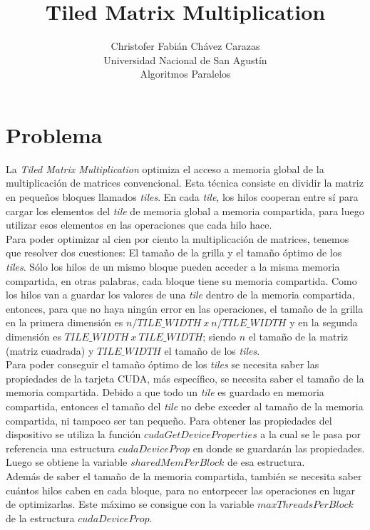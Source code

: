 \documentclass[a4paper,12pt]{article}
\begin{document}
\title{Tiled Matrix Multiplication}
\author{
Christofer Fabián Chávez Carazas \\
\small{Universidad Nacional de San Agustín} \\
\small{Algoritmos Paralelos}
}

\maketitle

\section{Problema}

La \textit{Tiled Matrix Multiplication} optimiza el acceso a memoria global de la multiplicación de matrices
convencional. Esta técnica consiste en dividir la matriz en pequeños bloques llamados \textit{tiles}. En cada \textit{tile},
los hilos cooperan entre sí para cargar los elementos del \textit{tile} de memoria global a memoria compartida, para luego
utilizar esos elementos en las operaciones que cada hilo hace. \\
Para poder optimizar al cien por ciento la multiplicación de matrices, tenemos que resolver dos cuestiones: El tamaño de la
grilla y el tamaño óptimo de los \textit{tiles}. Sólo los hilos de un mismo bloque pueden acceder a la misma memoria compartida,
en otras palabras, cada bloque tiene su memoria compartida. Como los hilos van a guardar los valores de una \textit{tile}
dentro de la memoria compartida, entonces, para que no haya ningún error en las operaciones, el tamaño de la grilla en la
primera dimensión es $n/TILE\_WIDTH\:x\:n/TILE\_WIDTH$ y en la segunda dimensión es $TILE\_WIDTH\:x\:TILE\_WIDTH$; siendo
$n$ el tamaño de la matriz (matriz cuadrada) y $TILE\_WIDTH$ el tamaño de los \textit{tiles}.\\
Para poder conseguir el tamaño óptimo de los \textit{tiles} se necesita saber las propiedades de la tarjeta CUDA, más específico,
se necesita saber el tamaño de la memoria compartida. Debido a que todo un \textit{tile} es guardado en memoria compartida, entonces
el tamaño del \textit{tile} no debe exceder al tamaño de la memoria compartida, ni tampoco ser tan pequeño. Para obtener las propiedades
del dispositivo se utiliza la función $cudaGetDeviceProperties$ a la cual se le pasa por referencia una estructura $cudaDeviceProp$
en donde se guardarán las propiedades. Luego se obtiene la variable $sharedMemPerBlock$ de esa estructura. \\
Además de saber el tamaño de la memoria compartida, también se necesita saber cuántos hilos caben en cada bloque, para no entorpecer
las operaciones en lugar de optimizarlas. Este máximo se consigue con la variable $maxThreadsPerBlock$ de la estructura $cudaDeviceProp$.
\end{document}
